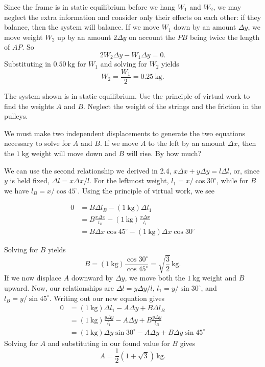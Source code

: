 \documentclass[../feynman-lectures-on-physics.tex]{subfiles}
\begin{document}
\begin{questions}
\begin{solution}
	Since the frame is in static equilibrium before we hang $W_1$ and $W_2$, we may neglect the extra information and consider only their effects on each other: if they balance, then the system will balance. If we move $W_1$ down by an amount $\Delta{y}$, we move weight $W_2$ up by an amount $2\Delta{y}$ on account the $PB$ being twice the length of $AP$. So
	\[
	2W_2\Delta{y} - W_1\Delta{y} = 0.
	\] 
	Substituting in $\SI{0.50}{\kilo\gram}$ for $W_1$ and solving for $W_2$ yields
	\[
	W_2 = \frac{W_1}{2} = \SI{0.25}{\kilo\gram}.
	\] 
\end{solution}

\question The system shown is in static equilibrium. Use the principle of virtual work to find the weights $A$ and $B$. Neglect the weight of the strings and the friction in the pulleys.

\begin{solution}
	We must make two independent displacements to generate the two equations necessary to solve for $A$ and $B$.  If we move $A$ to the left by an amount $\Delta{x}$, then the $\SI{1}{\kilo\gram}$ weight will move down and $B$ will rise. By how much?

	We can use the second relationship we derived in 2.4, $x\Delta{x} + y\Delta{y} = l\Delta{l}$, or, since $y$ is held fixed, $\Delta{l} = x\Delta{x}/l$. For the leftmost weight, $l_1 = x/\cos{30^\circ}$, while for $B$ we have $l_B = x/\cos{45^\circ}$. Using the principle of virtual work, we see

	\begin{align}
		0 &= B\Delta{l_B} - (\SI{1}{\kilo\gram})\Delta{l_1} \\
		  &= B\frac{x\Delta{x}}{l_B} - (\SI{1}{\kilo\gram})\frac{x\Delta{x}}{l_1} \\
		  &= B\Delta{x}\cos{45^\circ} - (\SI{1}{\kilo\gram})\Delta{x}\cos{30^\circ}
	\end{align}

	Solving for $B$ yields
	\[
	B = (\SI{1}{\kilo\gram})\frac{\cos{30^\circ}}{\cos{45^\circ}} = \sqrt{\frac{3}{2}}\,\si{\kilo\gram}.
	\] 
	If we now displace $A$ downward by $\Delta{y}$, we move both the $\SI{1}{\kilo\gram}$ weight and $B$ upward. Now, our relationships are $\Delta{l} = y\Delta{y}/l$, $l_1 = y/\sin{30^\circ}$, and $l_B = y/\sin{45^\circ}$. Writing out our new equation gives
	\begin{align}
		0 &= (\SI{1}{\kilo\gram})\Delta{l_1} - A\Delta{y} + B\Delta{l_B} \\
		  &= (\SI{1}{\kilo\gram})\frac{y\Delta{y}}{l_1} - A\Delta{y} + B\frac{y\Delta{y}}{l_B} \\
		  &= (\SI{1}{\kilo\gram})\Delta{y}\sin{30^\circ} - A\Delta{y} + B\Delta{y}\sin{45^\circ}
	\end{align}
	Solving for $A$ and substituting in our found value for $B$ gives
	\[
	A = \frac{1}{2}(1 + \sqrt{3})\,\si{\kilo\gram}.
	\] 
\end{solution}


\end{questions}
\end{document}
